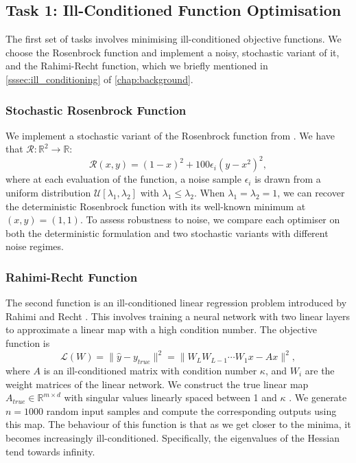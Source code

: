 \subsection{Task 1: Ill-Conditioned Function Optimisation}
\label{ssec:task_1_ill_conditioned_function_optimisation}
The first set of tasks involves minimising ill-conditioned objective functions. We choose the Rosenbrock function and implement a noisy, stochastic variant of it, and the Rahimi-Recht function, which we briefly mentioned in \cref{sssec:ill_conditioning} of \cref{chap:background}.

\subsubsection{Stochastic Rosenbrock Function}
\label{sssec:task_1_rosenbrock_function}
We implement a stochastic variant of the Rosenbrock function from \cite{henriques2019small}. We have that $\mathcal{R}: \mathbb{R}^2 \rightarrow \mathbb{R}$:
\begin{equation}
\mathcal{R}(x, y) = (1 - x)^2 + 100\epsilon_i(y - x^2)^2,
\end{equation}
where at each evaluation of the function, a noise sample $\epsilon_i$ is drawn from a uniform distribution $\mathcal{U}[\lambda_1, \lambda_2]$ with $\lambda_1 \leq \lambda_2$. When $\lambda_1 = \lambda_2 = 1$, we can recover the deterministic Rosenbrock function with its well-known minimum at $(x, y) = (1, 1)$. To assess robustness to noise, we compare each optimiser on both the deterministic formulation and two stochastic variants with different noise regimes.

\subsubsection{Rahimi-Recht Function}
\label{sssec:task_1_rahimi_recht_function}
The second function is an ill-conditioned linear regression problem introduced by Rahimi and Recht \citep{recht2017kitchen}. This involves training a neural network with two linear layers to approximate a linear map with a high condition number. The objective function is
\begin{equation}
\mathcal{L}(W) = \|\hat{y} - y_{true}\|^2 = \|W_L W_{L-1} \cdots W_1 x - Ax\|^2, 
\end{equation}
where $A$ is an ill-conditioned matrix with condition number $\kappa$, and $W_i$ are the weight matrices of the linear network. We construct the true linear map $A_{true} \in \mathbb{R}^{m \times d}$ with singular values linearly spaced between 1 and $\kappa$ \citep{recht2017kitchen}. We generate $n=1000$ random input samples and compute the corresponding outputs using this map. The behaviour of this function is that as we get closer to the minima, it becomes increasingly ill-conditioned. Specifically, the eigenvalues of the Hessian tend towards infinity.

